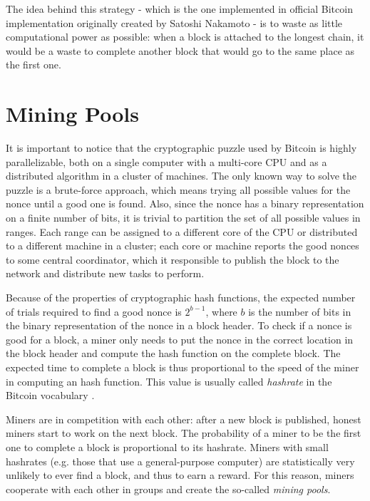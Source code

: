 The idea behind this strategy - which is the one implemented in official Bitcoin implementation originally created by Satoshi Nakamoto \cite{bitcoin_github} - is to waste as little computational power as possible:
when a block is attached to the longest chain, it would be a waste to complete another block that would go to the same place as the first one.

\section{Mining Pools}
It is important to notice that the cryptographic puzzle used by Bitcoin is highly parallelizable, both on a single computer with a multi-core \ac{CPU} and as a distributed algorithm in a cluster of machines.
The only known way to solve the puzzle is a brute-force approach, which means trying all possible values for the nonce until a good one is found.
Also, since the nonce has a binary representation on a finite number of bits, it is trivial to partition the set of all possible values in ranges.
Each range can be assigned to a different core of the \ac{CPU} or distributed to a different machine in a cluster;
each core or machine reports the good nonces to some central coordinator, which it responsible to publish the block to the network and distribute new tasks to perform.

Because of the properties of cryptographic hash functions, the expected number of trials required to find a good nonce is $2^{b - 1}$, where $b$ is the number of bits in the binary representation of the nonce in a block header.
To check if a nonce is good for a block, a miner only needs to put the nonce in the correct location in the block header and compute the hash function on the complete block.
The expected time to complete a block is thus proportional to the speed of the miner in computing an hash function.
This value is usually called \textit{hashrate} in the Bitcoin vocabulary \cite{bitcoin_vocabulary}.

Miners are in competition with each other:
after a new block is published, honest miners start to work on the next block.
The probability of a miner to be the first one to complete a block is proportional to its hashrate.
Miners with small hashrates (e.g. those that use a general-purpose computer) are statistically very unlikely to ever find a block, and thus to earn a reward.
For this reason, miners cooperate with each other in groups and create the so-called \textit{mining pools}.

